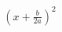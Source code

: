 \documentclass[preview]{standalone}
\begin{document}
\begin{align*}
{\left( x + \frac{b}{2 a} \right)}^{2}
\end{align*}
\end{document}
